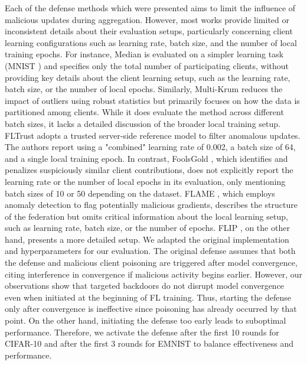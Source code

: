 Each of the defense methods which were presented aims to limit the influence of malicious updates during aggregation. However, most works provide limited or inconsistent details about their evaluation setups, particularly concerning client learning configurations such as learning rate, batch size, and the number of local training epochs. For instance, Median \citep{yin2018byzantine} is evaluated on a simpler learning task (MNIST \cite{mnist}) and specifies only the total number of participating clients, without providing key details about the client learning setup, such as the learning rate, batch size, or the number of local epochs. Similarly, Multi-Krum \citep{blanchard2017machine} reduces the impact of outliers using robust statistics but primarily focuses on how the data is partitioned among clients. While it does evaluate the method across different batch sizes, it lacks a detailed discussion of the broader local training setup. FLTrust \citep{cao2021fltrust} adopts a trusted server-side reference model to filter anomalous updates. The authors report using a "combined" learning rate of 0.002, a batch size of 64, and a single local training epoch. In contrast, FoolsGold \citep{fung2018mitigating}, which identifies and penalizes suspiciously similar client contributions, does not explicitly report the learning rate or the number of local epochs in its evaluation, only mentioning batch sizes of 10 or 50 depending on the dataset. FLAME \citep{nguyen2022flame}, which employs anomaly detection to flag potentially malicious gradients, describes the structure of the federation but omits critical information about the local learning setup, such as learning rate, batch size, or the number of epochs. FLIP \citep{zhang2023flip}, on the other hand, presents a more detailed setup. We adapted the original implementation and hyperparameters for our evaluation. The original defense assumes that both the defense and malicious client poisoning are triggered after model convergence, citing interference in convergence if malicious activity begins earlier. However, our observations show that targeted backdoors do not disrupt model convergence even when initiated at the beginning of FL training. Thus, starting the defense only after convergence is ineffective since poisoning has already occurred by that point. On the other hand, initiating the defense too early leads to suboptimal performance. Therefore, we activate the defense after the first 10 rounds for CIFAR-10 and after the first 3 rounds for EMNIST to balance effectiveness and performance.


